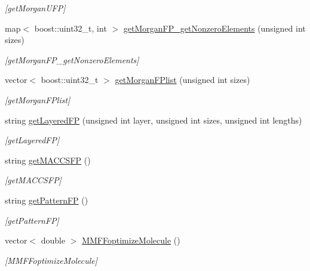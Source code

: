 \begin{DoxyCompactItemize}
\begin{DoxyCompactList}\small\item\em \mbox{[}get\+Morgan\+U\+FP\mbox{]} \end{DoxyCompactList}\item 
map$<$ boost\+::uint32\+\_\+t, int $>$ \mbox{\hyperlink{class_molecule_aa769820db6167c0861d1a784ba64ebbc}{get\+Morgan\+F\+P\+\_\+get\+Nonzero\+Elements}} (unsigned int sizes)
\begin{DoxyCompactList}\small\item\em \mbox{[}get\+Morgan\+F\+P\+\_\+get\+Nonzero\+Elements\mbox{]} \end{DoxyCompactList}\item 
vector$<$ boost\+::uint32\+\_\+t $>$ \mbox{\hyperlink{class_molecule_a8546f6429ed2147b33c9d61fc192513c}{get\+Morgan\+F\+Plist}} (unsigned int sizes)
\begin{DoxyCompactList}\small\item\em \mbox{[}get\+Morgan\+F\+Plist\mbox{]} \end{DoxyCompactList}\item 
string \mbox{\hyperlink{class_molecule_a63f6ddc4735f6b2464745ff3ffac724e}{get\+Layered\+FP}} (unsigned int layer, unsigned int sizes, unsigned int lengths)
\begin{DoxyCompactList}\small\item\em \mbox{[}get\+Layered\+FP\mbox{]} \end{DoxyCompactList}\item 
string \mbox{\hyperlink{class_molecule_ab883bbe83bb687a47fe8259dab882db1}{get\+M\+A\+C\+C\+S\+FP}} ()
\begin{DoxyCompactList}\small\item\em \mbox{[}get\+M\+A\+C\+C\+S\+FP\mbox{]} \end{DoxyCompactList}\item 
string \mbox{\hyperlink{class_molecule_a7f662f6ba9e4d12024ff242042df65be}{get\+Pattern\+FP}} ()
\begin{DoxyCompactList}\small\item\em \mbox{[}get\+Pattern\+FP\mbox{]} \end{DoxyCompactList}\item 
vector$<$ double $>$ \mbox{\hyperlink{class_molecule_a5e441ebbeef50a379ed79911805a5124}{M\+M\+F\+Foptimize\+Molecule}} ()
\begin{DoxyCompactList}\small\item\em \mbox{[}M\+M\+F\+Foptimize\+Molecule\mbox{]} \end{DoxyCompactList}\item 

\end{DoxyCompactItemize}
